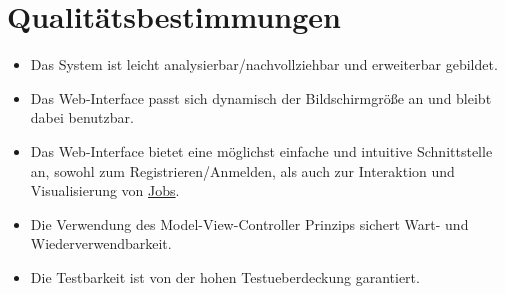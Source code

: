 \section{Qualitätsbestimmungen}
\begin{itemize}    
    \item Das System ist leicht analysierbar/nachvollziehbar und erweiterbar gebildet.
    \item Das \gls{Web-Interface} passt sich dynamisch der Bildschirmgröße an und bleibt dabei benutzbar.
    \item Das \gls{Web-Interface} bietet eine möglichst einfache und intuitive Schnittstelle an, sowohl zum Registrieren/Anmelden, als auch zur Interaktion und Visualisierung von \hyperref[B:Jobs]{Jobs}.
    \item Die Verwendung des \gls{Model-View-Controller} Prinzips sichert Wart- und Wiederverwendbarkeit.
    \item Die Testbarkeit ist von der hohen \gls{Testueberdeckung} garantiert.
\end{itemize}


